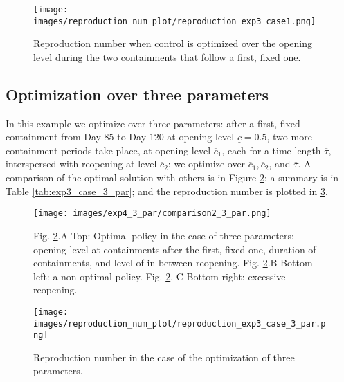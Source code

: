\documentclass{amsart}
\begin{document}
\begin{figure}[h!]
    \centering
    \texttt{[image: images/reproduction\_num\_plot/reproduction\_exp3\_case1.png]}
    \caption{Reproduction number when
    control is optimized over the
    opening level during the two containments 
    that follow a first, fixed one.}
    \label{reproduction_exp3_case1}
\end{figure}


\subsection{Optimization over three parameters}
\label{sec:opt_periodic_cont}
In this example we optimize over three parameters:
after a first, fixed containment from Day $85$ to 
Day $120$ at opening level $\underline c=0.5$, two
more containment periods take place, at 
opening level $\overline c_1$, each for a time length $\overline \tau$, 
interspersed with reopening at level $ \overline c_2$: we optimize
over $\overline c_1,  \overline c_2 $, and $\overline \tau$.
A comparison of the optimal solution with others is in 
Figure  \ref{comparison2_exp4}; a summary is in 
Table \ref{tab:exp3_case_3_par}; and the
reproduction number is plotted in 
\ref{reproduction_exp4}.


\begin{figure}[h!]
    \centering
    \texttt{[image: images/exp4\_3\_par/comparison2\_3\_par.png]}
    \caption{Fig. \ref{comparison2_exp4}.A Top: Optimal policy in the case of three parameters: opening level at containments
    after the first, fixed one, duration of containments,
    and level of in-between reopening. Fig. \ref{comparison2_exp4}.B Bottom left: a non optimal policy. Fig. \ref{comparison2_exp4}. C Bottom right: excessive reopening.}
    \label{comparison2_exp4}
\end{figure}

\begin{figure}[h!]
    \centering
    \texttt{[image: images/reproduction\_num\_plot/reproduction\_exp3\_case\_3\_par.png]}
    \caption{Reproduction number in the case of the optimization of three parameters.}
    \label{reproduction_exp4}
\end{figure}
\end{document}

